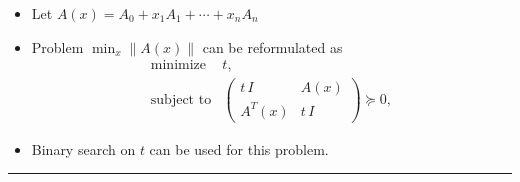 \documentclass[]{article}
\providecommand{\tightlist}{%
  \setlength{\itemsep}{0pt}\setlength{\parskip}{0pt}}
\begin{document}
\begin{itemize}
\tightlist
\item
  Let \(A(x) = A_0 + x_1 A_1 + \cdots + x_n A_n\)
\item
  Problem \(\min_x \| A(x) \|\) can be reformulated as
  \[\begin{array}{ll}
       \text{minimize}      & t, \\
       \text{subject to}    & \left(
   \begin{array}{cc}
    t\,I   & A(x) \\
    A^T(x) & t\,I
   \end{array} \right) \succeq 0,
   \end{array}\]
\item
  Binary search on \(t\) can be used for this problem.
\end{itemize}

\begin{center}\rule{0.5\linewidth}{\linethickness}\end{center}
\end{document}
